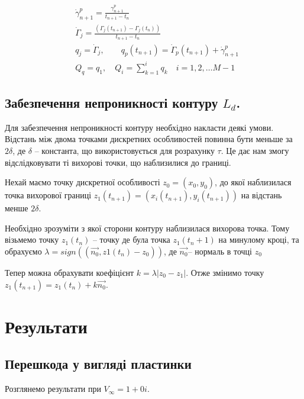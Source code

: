 \documentclass[a4paper,12pt]{article}
\begin{document}
	\begin{align}
		&\dot{\gamma}_{n+1}^p = \frac{\gamma_{n+1}^p}{t_{n+1} - t_n} \nonumber \\	
		&\dot{\Gamma}_j = \frac{\left(\Gamma_j(t_{n+1}) - \Gamma_{j}(t_{n})\right)}{t_{n+1} - t_n} \nonumber \\
		& q_j = \dot{\Gamma}_j, \qquad q_p(t_{n+1}) = \dot{\Gamma}_p(t_{n+1}) + \dot{\gamma}_{n+1}^p \nonumber \\
		&Q_q = q_1, \quad Q_i = \sum_{k=1}^i q_k \quad i = 1,2, \ldots M-1 \nonumber
	\end{align}
	
	\subsection{Забезпечення непроникності контуру $L_d$.}
	
	Для забезпечення непроникності контуру необхідно накласти деякі умови. Відстань між двома точками дискретних особливостей повинна бути меньше за $2\delta$, де $\delta$ -- константа, що використовується для розрахунку $\tau$. Це дає нам змогу відслідковувати ті вихорові точки, що наблизилися до границі.
	
	Нехай маємо точку дискретної особливості $z_0 = (x_0, y_0)$, до якої наблизилася точка вихорової границі $z_1(t_{n+1}) = (x_i(t_{n+1}), y_i(t_{n+1}))$ на відстань менше $2 \delta$.
	
	Необхідно зрозуміти з якої сторони контуру наблизилася вихорова точка. Тому візьмемо точку $z_1(t_{n})$ -- точку де була точка $z_1(t_n+1)$ на минулому кроці, та обрахуємо $\lambda = sign \left( (\vec{n_0}, z1(t_n) - z_0) \right)$, де $\vec{n_0}$-- нормаль в точці $z_0$
	
	Тепер можна обрахувати коефіцієнт $k = \lambda|z_0 - z_1|$. Отже змінимо точку $z_1(t_{n+1}) = z_1(t_n) + k\vec{n_0}$.
	
	\section{Результати}
	\subsection{Перешкода у вигляді пластинки}
	Розглянемо результати при $V_{\infty} = 1 + 0i$.
	
\end{document}
